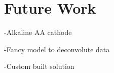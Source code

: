 \section{Future Work}

-Alkaline AA cathode

-Fancy model to deconvolute data

-Custom built solution

 